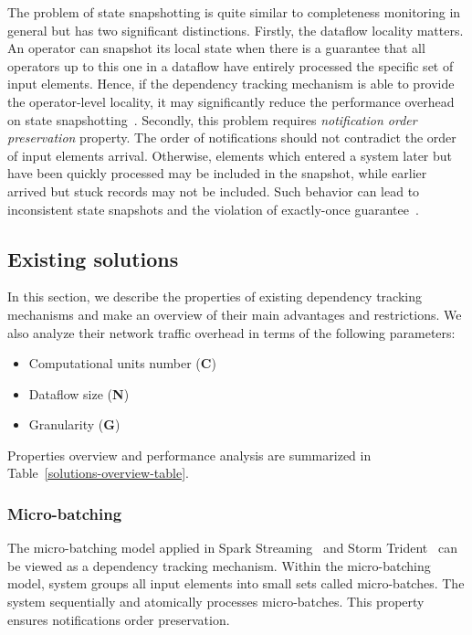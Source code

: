 The problem of state snapshotting is quite similar to completeness monitoring in general but has two significant distinctions. Firstly, the dataflow locality matters. An operator can snapshot its local state when there is a guarantee that all operators up to this one in a dataflow have entirely processed the specific set of input elements. Hence, if the dependency tracking mechanism is able to provide the operator-level locality, it may significantly reduce the performance overhead on state snapshotting~\cite{Carbone:2017:SMA:3137765.3137777}. Secondly, this problem requires {\em notification order preservation} property. The order of notifications should not contradict the order of input elements arrival. Otherwise, elements which entered a system later but have been quickly processed may be included in the snapshot, while earlier arrived but stuck records may not be included. Such behavior can lead to inconsistent state snapshots and the violation of exactly-once guarantee~\cite{2015arXiv150608603C}. 

\subsection{Existing solutions} \label{existing_solutions}

In this section, we describe the properties of existing dependency tracking mechanisms and make an overview of their main advantages and restrictions. We also analyze their network traffic overhead in terms of the following parameters:
\begin{itemize}
    \item Computational units number (\textbf{C})
    \item Dataflow size (\textbf{N})
    \item Granularity (\textbf{G})
\end{itemize}

Properties overview and performance analysis are summarized in Table~\ref{solutions-overview-table}.

\subsubsection{Micro-batching}

The micro-batching model applied in Spark Streaming~\cite{Zaharia:2012:DSE:2342763.2342773} and Storm Trident~\cite{apache:storm:trident} can be viewed as a dependency tracking mechanism. Within the micro-batching model, system groups all input elements into small sets called micro-batches. The system sequentially and atomically processes micro-batches. This property ensures notifications order preservation. 

